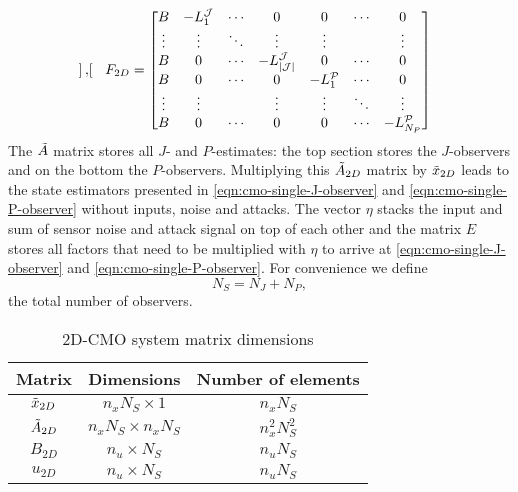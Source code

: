 \begin{equation}
\begin{split}
\begin{bmatrix}
        \end{bmatrix}, \quad 
        F_{2D} = 
        \begin{bmatrix}
            B & -L_1^{\mathcal{J}} & \cdots & 0 & 0 & \cdots & 0 \\
            \vdots & \vdots & \ddots & \vdots & \vdots & & \vdots \\
            B & 0 & \cdots & -L_{|\mathcal{J}|}^{\mathcal{J}} & 0 & \cdots & 0 \\
            B & 0 & \cdots & 0 & -L_{1}^{\mathcal{P}} & \cdots & 0 \\
            \vdots & \vdots & & \vdots & \vdots & \ddots & \vdots \\
            B & 0 & \cdots & 0 & 0 & \cdots & -L_{N_P}^{\mathcal{P}} \\
        \end{bmatrix}\\
    \end{split}
\end{equation}
The $\Tilde{A}$ matrix stores  all $J$- and $P$-estimates: the top section stores the $J$-observers and on the bottom the $P$-observers. Multiplying this $\Tilde{A}_{2D}$ matrix by $\Tilde{x}_{2D}$ leads to the state estimators presented in \eqref{eqn:cmo-single-J-observer} and \eqref{eqn:cmo-single-P-observer} without inputs, noise and attacks. The vector $\eta$ stacks the input and sum of sensor noise and attack signal on top of each other and the matrix $E$ stores all factors that need to be multiplied with $\eta$ to arrive at \eqref{eqn:cmo-single-J-observer} and \eqref{eqn:cmo-single-P-observer}. For convenience we define
\begin{equation*}
    N_S = N_J + N_P,
\end{equation*}
the total number of observers.
\begin{table}[h]
    \centering
    \begin{tabular}{|c|c|c|}
       \toprule
       Matrix  & Dimensions & Number of elements \\ \midrule
       $\Tilde{x}_{2D}$  & $n_xN_S \times 1$ & $n_xN_S$ \\
       $\Tilde{A}_{2D}$ & $n_xN_S \times n_xN_S$ & $n_x^2N_S^2$ \\
       $B_{2D}$ & $n_u \times N_S$ & $n_uN_S$ \\
       $u_{2D}$ & $n_u \times N_S$ & $n_uN_S$ \\
       \bottomrule
    \end{tabular}
    \caption{2D-CMO system matrix dimensions}
    \label{tab:2D-CMO-dimensions}
\end{table}



